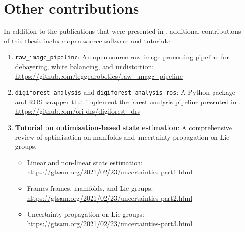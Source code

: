 
\chapter{Other contributions}
\label{app:A}


In addition to the publications that were presented in , additional contributions of this thesis include open-source software and tutorials:

\begin{enumerate}[leftmargin=*]
	\item \texttt{raw\_image\_pipeline}: An open-source raw image processing pipeline for debayering, white balancing, and undistortion:\\
	\url{https://github.com/leggedrobotics/raw_image_pipeline}
	\item \texttt{digiforest\_analysis} and \texttt{digiforest\_analysis\_ros}: A Python package and ROS wrapper that implement the forest analysis pipeline presented in :\\
	\url{https://github.com/ori-drs/digiforest_drs}
	\item \textbf{Tutorial on optimisation-based state estimation}: A comprehensive review of optimisation on manifolds and uncertainty propagation on Lie groups.
	\begin{itemize}
		\item Linear and non-linear state estimation:\\
		\url{https://gtsam.org/2021/02/23/uncertainties-part1.html} 
		\item Frames frames, manifolds, and Lie groups:\\
		\url{https://gtsam.org/2021/02/23/uncertainties-part2.html} 
		\item Uncertainty propagation on Lie groups:\\
		\url{https://gtsam.org/2021/02/23/uncertainties-part3.html} 
	\end{itemize}
\end{enumerate}